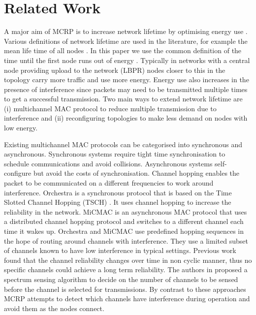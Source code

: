 \section{Related Work}
\label{RelatedWork}

 A major aim of MCRP is to increase network lifetime by optimising energy use \added{[r]}.  Various definitions of network lifetime are used in the literature, for example the mean life time of all nodes \added{[r]}.  In this paper we use the common definition of the time until the first node runs out of energy .  Typically in networks with a central node providing upload to the network (LBPR) nodes closer to this in the topology carry more traffic and use more energy.  Energy use also increases in the presence of interference since packets may need to be transmitted multiple times to get a successful transmission. Two main ways to extend network lifetime are (i) multichannel MAC protocol to reduce multiple transmission due to interference and (ii) reconfiguring topologies to make less demand on nodes with low energy.

Existing multichannel MAC protocols can be categorised into synchronous and asynchronous. Synchronous systems require tight time synchronisation to schedule communications and avoid collisions. Asynchronous systems self-configure but avoid the costs of synchronisation.
Channel hopping enables the packet to be communicated on a different frequencies to work around interference.  Orchestra \cite{orchestra} is a synchronous protocol that is based on the Time Slotted Channel Hopping (TSCH) \cite{tsch}. It uses channel hopping to increase the reliability in the network.  MiCMAC \cite{micmac} is an asynchronous MAC protocol that uses a distributed channel hopping protocol and switches to a different channel each time it wakes up.  Orchestra and MiCMAC use predefined hopping sequences in the hope of routing around channels with interference.  They use a limited subset of channels known to have low interference in typical settings. Previous work~\cite{homearea,oppcast} found that the channel reliability changes over time in non cyclic manner, thus no specific channels could achieve a long term reliability. The authors in \cite{energyluca} proposed a spectrum sensing algorithm to decide on the number of channels to be sensed before the channel is selected for transmissions.  By contrast to these approaches MCRP attempts to detect which channels have interference during operation and avoid them as the nodes connect.

